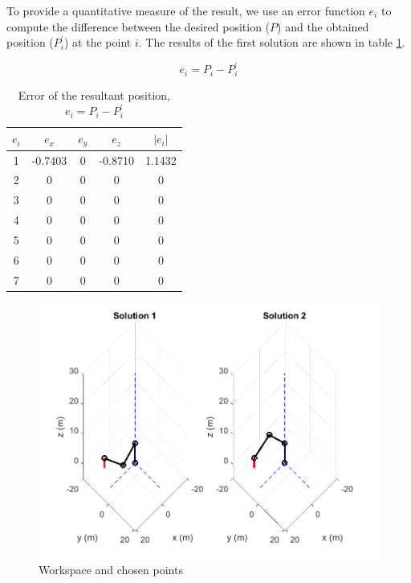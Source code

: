 \documentclass{article}
\begin{document}
To provide a quantitative measure of the result, we use an error function $e_i$ to compute the difference between the desired position ($P$) and the obtained position ($P_i^{\prime}$) at the point $i$.  The results of the first solution are shown in table \ref{tab:inverse_test.error}.

\begin{equation}
e_i=P_i-P_i^{\prime}
\end{equation}

\begin{table}[h!]
\centering
\begin{tabular}{ c | c c c || c}
 $e_i$ 	& $e_x$ 		& $e_y$	& $e_z$		& $|e_i|$\\ \hline
 1 			& -0.7403 	& 0			& -0.8710		& 1.1432\\
 2 			& 0 				& 0			& 0				& 0\\ 
 3 			& 0 				& 0			& 0				& 0\\ 
 4 			& 0 				& 0			& 0				& 0\\ 
 5 			& 0 				& 0			& 0				& 0\\
 6 			& 0 				& 0			& 0				& 0\\
 7 			& 0 				& 0			& 0				& 0\\
\end{tabular}
\caption{Error of the resultant position, $e_i=P_i-P_i^{\prime}$}
\label{tab:inverse_test.error}
\end{table}

\begin{figure}
\begin{center}
\includegraphics[width=\textwidth]{images/inverse_test}
\caption{Workspace and chosen points}
\label{fig:inverse_test.test}
\end{center}
\end{figure}
\end{document}

